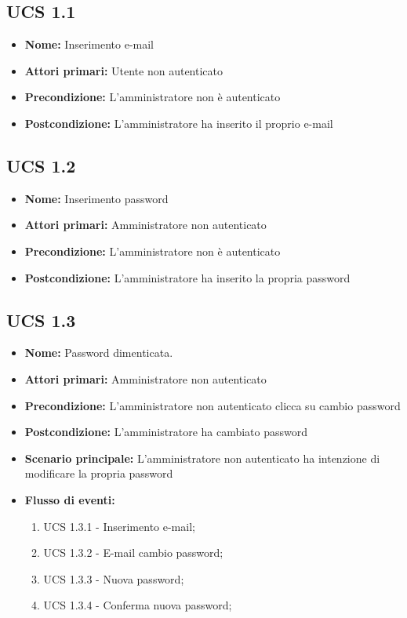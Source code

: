 \subsection{UCS 1.1}%
\begin{itemize}
\item \textbf{Nome:} Inserimento e-mail
\item \textbf{Attori primari:}  Utente non autenticato
\item \textbf{Precondizione:}  L'amministratore non è autenticato
\item \textbf{Postcondizione:}  L'amministratore ha inserito il proprio e-mail
\end{itemize}


\subsection{UCS 1.2}%
\begin{itemize}
\item \textbf{Nome:} Inserimento password
\item \textbf{Attori primari:} Amministratore non autenticato
\item \textbf{Precondizione:} L'amministratore non è autenticato
\item \textbf{Postcondizione:} L'amministratore ha inserito la propria password
\end{itemize}


\subsection{UCS 1.3}%
\begin{itemize}
\item \textbf{Nome:} Password dimenticata.
\item \textbf{Attori primari:} Amministratore non autenticato
\item \textbf{Precondizione:}  L'amministratore non autenticato clicca su cambio password
\item \textbf{Postcondizione:} L'amministratore ha cambiato password
\item \textbf{Scenario principale:} L'amministratore non autenticato ha intenzione di modificare la propria password
\item \textbf{Flusso di eventi:}
    \begin{enumerate}
        \item UCS 1.3.1 - Inserimento e-mail;
        \item UCS 1.3.2 - E-mail cambio password;
        \item UCS 1.3.3 - Nuova password;
        \item UCS 1.3.4 - Conferma nuova password;
    \end{enumerate}
\end{itemize}

